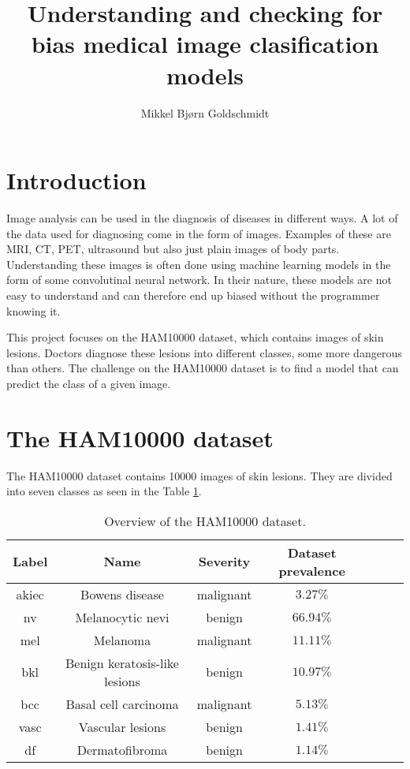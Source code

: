 \documentclass[11pt,a4paper]{article}
\title{Understanding and checking for bias medical image clasification models}
\author{Mikkel Bjørn Goldschmidt}
\begin{document}
\maketitle

\section{Introduction}
Image analysis can be used in the diagnosis of diseases in different ways.
A lot of the data used for diagnosing come in the form of images.
Examples of these are MRI, CT, PET, ultrasound but also just plain images of body parts.
Understanding these images is often done using machine learning models in the form of
some convolutinal neural network.
In their nature, these models are not easy to understand and can therefore end up biased without
the programmer knowing it.

This project focuses on the HAM10000 dataset\cite{Tschandl_2018}, which contains images of skin lesions.
Doctors diagnose these lesions into different classes, some more dangerous than others.
The challenge on the HAM10000 dataset is to find a model that can predict the class of a given image.

\section{The HAM10000 dataset}
The HAM10000 dataset contains 10000 images of skin lesions.
They are divided into seven classes as seen in the Table \ref{table:ham10000}.

\begin{table}[ht]
\begin{center}
\begin{tabular}{|c|c|c|c|c|c|c|}
\hline
Label    & Name                          & Severity  & Dataset prevalence \\ \hline
akiec    & Bowens disease                & malignant & $3.27\%$           \\ \hline
nv       & Melanocytic nevi              & benign    & $66.94\%$          \\ \hline
mel      & Melanoma                      & malignant & $11.11\%$          \\ \hline
bkl      & Benign keratosis-like lesions & benign    & $10.97\%$          \\ \hline
bcc      & Basal cell carcinoma          & malignant & $5.13\%$           \\ \hline
vasc     & Vascular lesions              & benign    & $1.41\%$           \\ \hline
df       & Dermatofibroma                & benign    & $1.14\%$           \\ \hline

\end{tabular}
\end{center}
\caption{Overview of the HAM10000 dataset.}
\label{table:ham10000}
\end{table}


\printbibliography[title={Litterature}]
\end{document}
